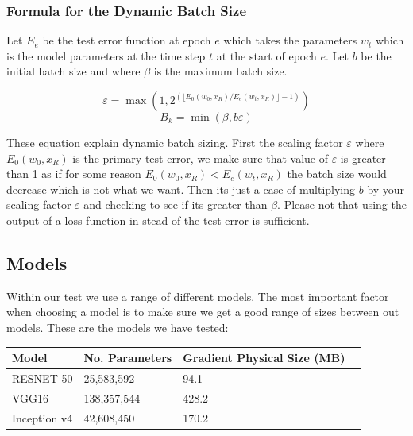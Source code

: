 \documentclass[11pt]{article}
\begin{document}
\subsubsection{Formula for the Dynamic Batch Size}

Let $E_e$ be the test error function at epoch $e$ which takes the parameters $w_t$ which is the model parameters at the time step $t$ at the start of epoch $e$. Let $b$ be the initial batch size and where      $\beta$ is the maximum batch size.  

\begingroup
\Large
$$
\varepsilon = \max \left(1, 2^{(\lfloor E_0(w_0,x_R)/E_e(w_t, x_R) \rfloor -1)} \right)
$$
$$
B_k = \min \left(\beta,b\varepsilon\right)
$$
\endgroup

These equation explain dynamic batch sizing. First the scaling factor $\varepsilon$ where $E_0(w_0,x_R)$ is the primary test error, we make sure that value of $\varepsilon$ is greater than 1 as if for some reason $E_0(w_0,x_R) < E_e(w_t, x_R)$ the batch size would decrease which is not what we want. Then its just a case of multiplying $b$ by your scaling factor $\varepsilon$ and checking to see if its greater than $\beta$. Please not that using the output of a loss function in stead of the test error is sufficient.


\subsection{Models}
Within our test we use a range of different models. The most important factor when choosing a model is to make sure we get a good range of sizes between out models. These are the models we have tested:

\begin{center}
\begin{tabular}{| p{3cm} | p{3cm} | p{3cm} | p{3cm} |} 
\hline
Model & No. Parameters &  Gradient Physical Size (MB)\\ \hline
RESNET-50 & 25,583,592 &  94.1 \\ \hline
VGG16 &  138,357,544 &  428.2 \\ \hline
Inception v4 & 42,608,450 &  170.2\\ \hline
\end{tabular}
\end{center}
\end{document}
